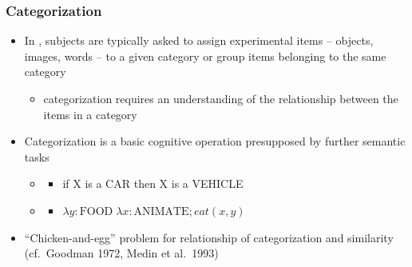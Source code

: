 \begin{frame}
\frametitle{Categorization}

\begin{itemize}
\item In , subjects are typically asked to assign experimental items -- objects, images, words -- to a given category or group items belonging to the same category
\begin{itemize}
\item categorization requires an understanding of the relationship between the items in a category
\end {itemize}
\item Categorization is a basic cognitive operation presupposed by further semantic tasks
\begin{itemize}
\item {}
\begin{itemize}
\item if X is a CAR then X is a VEHICLE
\end{itemize}
\item {}
\begin{itemize}
\item $\lambda y:\text{FOOD}\; \lambda x:\text{ANIMATE}; eat(x,y)$
\end{itemize}
\end{itemize}
\item ``Chicken-and-egg'' problem for relationship of categorization and similarity (cf.\ Goodman 1972, Medin et al.\ 1993)
\end{itemize}
\end{frame}


